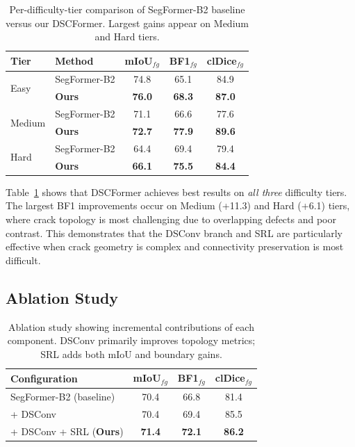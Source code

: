 \documentclass[10pt,twocolumn,letterpaper]{article}
\begin{document}
\begin{table}[t]
\centering
\caption{Per-difficulty-tier comparison of SegFormer-B2 baseline versus our DSCFormer. Largest gains appear on Medium and Hard tiers.}
\label{tab:tier}
\begin{tabular}{llccc}
\toprule
Tier & Method & mIoU$_{fg}$ & BF1$_{fg}$ & clDice$_{fg}$ \\
\midrule
\multirow{2}{*}{Easy} & SegFormer-B2 & 74.8 & 65.1 & 84.9 \\
 & \textbf{Ours} & \textbf{76.0} & \textbf{68.3} & \textbf{87.0} \\
\midrule
\multirow{2}{*}{Medium} & SegFormer-B2 & 71.1 & 66.6 & 77.6 \\
 & \textbf{Ours} & \textbf{72.7} & \textbf{77.9} & \textbf{89.6} \\
\midrule
\multirow{2}{*}{Hard} & SegFormer-B2 & 64.4 & 69.4 & 79.4 \\
 & \textbf{Ours} & \textbf{66.1} & \textbf{75.5} & \textbf{84.4} \\
\bottomrule
\end{tabular}
\end{table}

Table~\ref{tab:tier} shows that DSCFormer achieves best results on \emph{all three} difficulty tiers. The largest BF1 improvements occur on Medium (+11.3) and Hard (+6.1) tiers, where crack topology is most challenging due to overlapping defects and poor contrast. This demonstrates that the DSConv branch and SRL are particularly effective when crack geometry is complex and connectivity preservation is most difficult.

\subsection{Ablation Study}

\begin{table}[t]
\centering
\caption{Ablation study showing incremental contributions of each component. DSConv primarily improves topology metrics; SRL adds both mIoU and boundary gains.}
\label{tab:ablation}
\begin{tabular}{lccc}
\toprule
Configuration & mIoU$_{fg}$ & BF1$_{fg}$ & clDice$_{fg}$ \\
\midrule
SegFormer-B2 (baseline) & 70.4 & 66.8 & 81.4 \\
+ DSConv & 70.4 & 69.4 & 85.5 \\
+ DSConv + SRL (\textbf{Ours}) & \textbf{71.4} & \textbf{72.1} & \textbf{86.2} \\
\bottomrule
\end{tabular}
\end{table}
\end{document}
